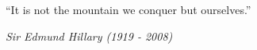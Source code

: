 
\begin{dedication}

``It is not the mountain we conquer but ourselves.''

\textit{Sir Edmund Hillary (1919 - 2008)}

\end{dedication}